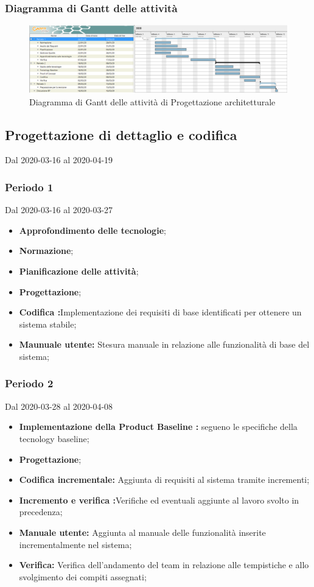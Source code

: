 \subsubsection{Diagramma di Gantt delle attività}
\begin{figure}[h]
	\includegraphics[scale=0.45]{sezioni/DiagrammiGantt/RP.png}
	\caption{Diagramma di Gantt delle attività di Progettazione architetturale}
\end{figure}

\subsection{Progettazione di dettaglio e codifica}
Dal 2020-03-16 al 2020-04-19\\

\subsubsection{Periodo 1} 
Dal 2020-03-16 al 2020-03-27\\
\begin{itemize}
	\item \textbf{Approfondimento delle tecnologie};
	\item \textbf{Normazione};
	\item \textbf{Pianificazione delle attività};
	\item \textbf{Progettazione};
	\item \textbf{Codifica :}Implementazione dei requisiti di base identificati per ottenere un sistema stabile;
	\item \textbf{Maunuale utente: }Stesura manuale in relazione alle funzionalità di base del sistema;
\end{itemize}
\subsubsection{Periodo 2} 
Dal 2020-03-28 al 2020-04-08\\
\begin{itemize}
	\item \textbf{Implementazione della Product Baseline :} segueno le specifiche della tecnology baseline;
	\item \textbf{Progettazione};
	\item \textbf{Codifica incrementale: }Aggiunta di requisiti al sistema tramite incrementi;
	\item \textbf{Incremento e verifica :}Verifiche ed eventuali aggiunte al lavoro svolto in precedenza;
	\item \textbf{Manuale utente: }Aggiunta al manuale delle funzionalità inserite incrementalmente nel sistema;
	\item \textbf{Verifica: }Verifica dell'andamento del team in relazione alle tempistiche e allo svolgimento dei compiti assegnati;
\end{itemize}
